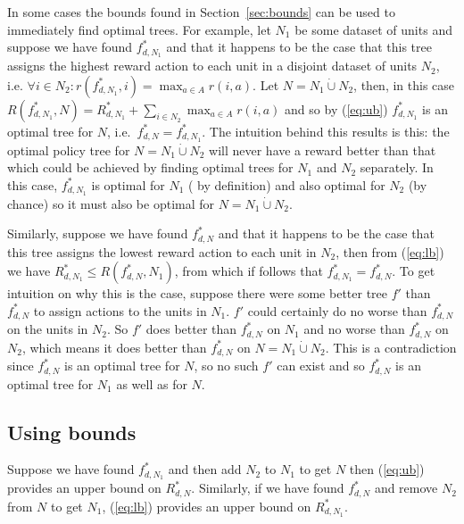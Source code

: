 \documentclass{article}
\begin{document}
In some cases the bounds found in Section~\ref{sec:bounds} can be used
to immediately find optimal trees. For example, let $N_1$ be some
dataset of units and suppose we have found $f^{*}_{d,N_{1}}$ and that
it happens to be the case that this tree assigns the highest reward
action to each unit in a disjoint dataset of units $N_2$, i.e.
$\forall i \in N_{2} : r(f^{*}_{d,N_{1}},i) = \max_{a \in A}
r(i,a)$. Let $N = N_{1} \dot\cup N_{2}$, then, in this case
$R(f^{*}_{d,N_{1}},N) = R^{*}_{d,N_{1}} + \sum_{i \in N_{2}} \max_{a
  \in A} r(i,a)$ and so by (\ref{eq:ub}) $f^{*}_{d,N_{1}}$ is an
optimal tree for $N$, i.e.\ $f^{*}_{d,N} = f^{*}_{d,N_{1}}$. The
intuition behind this results is this: the optimal policy tree for
$N = N_{1} \dot\cup N_{2}$ will never have a reward better than that
which could be achieved by finding optimal trees for $N_1$ and $N_2$
separately. In this case, $f^{*}_{d,N_{1}}$ is optimal for $N_1$ ( by
definition) and also optimal for $N_2$ (by chance) so it must also be
optimal for $N = N_{1} \dot\cup N_{2}$.

Similarly, suppose we have found $f^{*}_{d,N}$ and that it happens to
be the case that this tree assigns the lowest reward action to each
unit in $N_2$, then from (\ref{eq:lb}) we have
$R^{*}_{d,N_{1}} \leq R(f^{*}_{d,N},N_{1})$, from which if follows
that $f^{*}_{d,N_{1}} = f^{*}_{d,N}$. To get intuition on why this is
the case, suppose there were some better tree $f'$ than $f^{*}_{d,N}$
to assign actions to the units in $N_1$. $f'$ could certainly do no
worse than $f^{*}_{d,N}$ on the units in $N_2$. So $f'$ does better
than $f^{*}_{d,N}$ on $N_1$ and no worse than $f^{*}_{d,N}$ on $N_2$,
which means it does better than $f^{*}_{d,N}$ on $N = N_{1} \dot\cup
N_{2}$. This is a contradiction since $f^{*}_{d,N}$ is an optimal tree
for $N$, so no such $f'$ can exist and so $f^{*}_{d,N}$ is an optimal
tree for $N_1$ as well as for $N$.


\subsection{Using bounds}
\label{sec:usingbounds}



Suppose we have found $f^{*}_{d,N_{1}}$
and then add $N_2$ to $N_{1}$ to get $N$ then (\ref{eq:ub}) provides
an upper bound on $R^{*}_{d,N}$. Similarly, if we have found
$f^{*}_{d,N}$ and remove $N_2$ from $N$ to get $N_1$, (\ref{eq:lb})
provides an upper bound on $R^{*}_{d,N_{1}}$.
\end{document}
